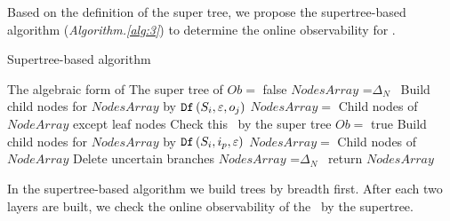 Based on the definition of the super tree, we propose the supertree-based algorithm ({\em Algorithm.\ref{alg:3}}) to determine the online observability for \BCNs. 
\begin{algorithm}[h]
\caption{Supertree-based algorithm}
\begin{algorithmic}[1]
\REQUIRE 
The algebraic form of \BCN
\ENSURE  
The super tree of \BCN
\STATE  $Ob=$ false %
\STATE  $NodesArray$ =$\Delta_N$\
\STATE Build child nodes for $NodesArray$ by ${\tt Df}\left(S_i,\varepsilon, o_j\right)$
\STATE $NodesArray=$ Child nodes of $NodeArray$ except leaf nodes
\STATE Check this \BCN\ by the super tree
\STATE $Ob=$ true
\ENDIF
\STATE Build child nodes for $NodesArray$ by ${\tt Df}\left(S_i,i_p,\varepsilon\right)$
\STATE $NodesArray=$ Child nodes of $NodeArray$
\ENDWHILE
\STATE Delete uncertain branches
\STATE  $NodesArray$ =$\Delta_N$\
\STATE return $NodesArray$
\end{algorithmic}
 \label{alg:3}
\end{algorithm}
In the supertree-based algorithm we build trees by breadth first. After each two layers are built, we check the online observability of the \BCN\ by the supertree. 

